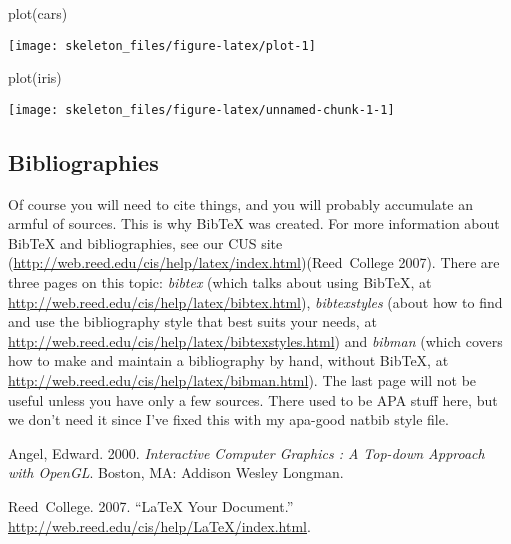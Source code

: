 \documentclass[12pt,twoside]{reedthesis}
\begin{document}
  \begin{CodeChunk}
  \begin{CodeInput}
  plot(cars)
  \end{CodeInput}


  \begin{center}\texttt{[image: skeleton\_files/figure-latex/plot-1]} \end{center}

  \end{CodeChunk}

  \begin{CodeChunk}
  \begin{CodeInput}
  plot(iris)
  \end{CodeInput}


  \begin{center}\texttt{[image: skeleton\_files/figure-latex/unnamed-chunk-1-1]} \end{center}

  \end{CodeChunk}

  \section{Bibliographies}

  Of course you will need to cite things, and you will probably accumulate
  an armful of sources. This is why BibTeX was created. For more
  information about BibTeX and bibliographies, see our CUS site
  (\url{http://web.reed.edu/cis/help/latex/index.html})(Reed~College
  2007). There are three pages on this topic: \emph{bibtex} (which talks
  about using BibTeX, at
  \url{http://web.reed.edu/cis/help/latex/bibtex.html}),
  \emph{bibtexstyles} (about how to find and use the bibliography style
  that best suits your needs, at
  \url{http://web.reed.edu/cis/help/latex/bibtexstyles.html}) and
  \emph{bibman} (which covers how to make and maintain a bibliography by
  hand, without BibTeX, at
  \url{http://web.reed.edu/cis/help/latex/bibman.html}). The last page
  will not be useful unless you have only a few sources. There used to be
  APA stuff here, but we don't need it since I've fixed this with my
  apa-good natbib style file.



  Angel, Edward. 2000. \emph{Interactive Computer Graphics : A Top-down
  Approach with OpenGL}. Boston, MA: Addison Wesley Longman.

  Reed~College. 2007. ``LaTeX Your Document.''
  \url{http://web.reed.edu/cis/help/LaTeX/index.html}.


      \chapter*{\bibname}
    
    
\end{document}
